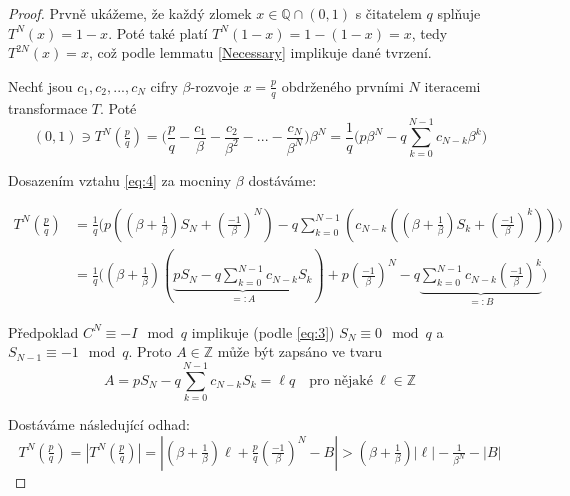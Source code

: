 \documentclass{article}
\theoremstyle{definition}
\theoremstyle{definition}
\theoremstyle{remark}
\numberwithin{equation}{section}
\begin{document}
\begin{proof}
	Prvně ukážeme, že každý zlomek $x \in \mathbb{Q} \cap (0,1)$ s čitatelem $q$ splňuje $T^N(x) = 1 - x$. Poté také platí $T^N(1 - x) = 1 - (1 - x) = x$, tedy $T^{2N}(x) = x$, což podle lemmatu \ref{Necessary} implikuje dané tvrzení.

	Nechť jsou $c_1, c_2, ..., c_N$ cifry $\beta$-rozvoje $x = \frac{p}{q}$ obdrženého prvními $N$ iteracemi transformace $T$. Poté
	\begin{equation} \label{eq:6}
		(0, 1) \ni T^N(\tfrac{p}{q}) = \bigg(\frac{p}{q} - \frac{c_1}{\beta} - \frac{c_2}{\beta^2} - ... - \frac{c_N}{\beta^N}\bigg)\beta^N = \frac{1}{q}\bigg(p\beta^N - q\sum^{N - 1}_{k = 0}c_{N - k}\beta^k\bigg)
	\end{equation}

	Dosazením vztahu \eqref{eq:4} za mocniny $\beta$ dostáváme:

	\begin{align*}
		T^N(\tfrac{p}{q}) & = \frac{1}{q}\bigg(p\left((\beta + \tfrac{1}{\beta}) S_N + (\tfrac{-1}{\beta})^N\right) - q\sum^{N - 1}_{k = 0}\left(c_{N - k}\left((\beta + \tfrac{1}{\beta}) S_k + (\tfrac{-1}{\beta})^k\right)\right)\bigg)        \\
		                  & = \frac{1}{q}\bigg( (\beta + \tfrac{1}{\beta})(\underbrace{pS_N - q\sum^{N - 1}_{k = 0}c_{N - k}S_k}_{=: A}) + p(\tfrac{-1}{\beta})^N - q\underbrace{\sum^{N - 1}_{k = 0}c_{N - k}(\tfrac{-1}{\beta})^k}_{=:B} \bigg)
	\end{align*}

	Předpoklad $C^N \equiv -I \mod q$ implikuje (podle \eqref{eq:3}) $S_N \equiv 0 \mod q$ a $S_{N - 1} \equiv -1 \mod q$. Proto $A \in \mathbb{Z}$ může být zapsáno ve tvaru
	\begin{equation*}
		A = pS_N - q\sum^{N - 1}_{k = 0}c_{N - k}S_k = \ell q \quad \textrm{pro nějaké}\ \ell \in \mathbb{Z}
	\end{equation*}

	Dostáváme následující odhad:
	\begin{equation} \label{B estimate}
		T^N(\tfrac{p}{q}) = |T^N(\tfrac{p}{q})| = |(\beta + \tfrac{1}{\beta})\ell + \tfrac{p}{q}(\tfrac{-1}{\beta})^N - B| > (\beta + \tfrac{1}{\beta})|\ell| - \tfrac{1}{\beta^N} - |B|
	\end{equation}


\end{proof}
\end{document}
